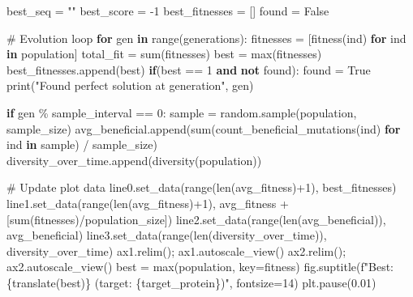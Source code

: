 \documentclass[
  letterpaper,
  DIV=11,
  numbers=noendperiod]{scrreprt}
\newenvironment{Shaded}{\begin{snugshade}}{\end{snugshade}}
\newcommand{\BuiltInTok}[1]{\textcolor[rgb]{0.00,0.23,0.31}{#1}}
\newcommand{\CommentTok}[1]{\textcolor[rgb]{0.37,0.37,0.37}{#1}}
\newcommand{\ControlFlowTok}[1]{\textcolor[rgb]{0.00,0.23,0.31}{\textbf{#1}}}
\newcommand{\DecValTok}[1]{\textcolor[rgb]{0.68,0.00,0.00}{#1}}
\newcommand{\FloatTok}[1]{\textcolor[rgb]{0.68,0.00,0.00}{#1}}
\newcommand{\KeywordTok}[1]{\textcolor[rgb]{0.00,0.23,0.31}{\textbf{#1}}}
\newcommand{\NormalTok}[1]{\textcolor[rgb]{0.00,0.23,0.31}{#1}}
\newcommand{\OperatorTok}[1]{\textcolor[rgb]{0.37,0.37,0.37}{#1}}
\newcommand{\SpecialCharTok}[1]{\textcolor[rgb]{0.37,0.37,0.37}{#1}}
\newcommand{\SpecialStringTok}[1]{\textcolor[rgb]{0.13,0.47,0.30}{#1}}
\newcommand{\StringTok}[1]{\textcolor[rgb]{0.13,0.47,0.30}{#1}}
\newcommand{\VariableTok}[1]{\textcolor[rgb]{0.07,0.07,0.07}{#1}}
\theoremstyle{definition}
\theoremstyle{remark}
\begin{document}
\begin{tcolorbox}
\begin{Shaded}
\begin{Highlighting}[]
\NormalTok{best\_seq }\OperatorTok{=} \StringTok{""}
\NormalTok{best\_score }\OperatorTok{=} \OperatorTok{{-}}\DecValTok{1}
\NormalTok{best\_fitnesses }\OperatorTok{=}\NormalTok{ []}
\NormalTok{found }\OperatorTok{=} \VariableTok{False}

\CommentTok{\# Evolution loop}
\ControlFlowTok{for}\NormalTok{ gen }\KeywordTok{in} \BuiltInTok{range}\NormalTok{(generations):}
\NormalTok{    fitnesses }\OperatorTok{=}\NormalTok{ [fitness(ind) }\ControlFlowTok{for}\NormalTok{ ind }\KeywordTok{in}\NormalTok{ population]}
\NormalTok{    total\_fit }\OperatorTok{=} \BuiltInTok{sum}\NormalTok{(fitnesses)}
\NormalTok{    best }\OperatorTok{=} \BuiltInTok{max}\NormalTok{(fitnesses)}
\NormalTok{    best\_fitnesses.append(best)}
    \ControlFlowTok{if}\NormalTok{(best }\OperatorTok{==} \DecValTok{1} \KeywordTok{and} \KeywordTok{not}\NormalTok{ found):}
\NormalTok{        found }\OperatorTok{=} \VariableTok{True}
        \BuiltInTok{print}\NormalTok{(}\StringTok{"Found perfect solution at generation"}\NormalTok{, gen)}
        
    \ControlFlowTok{if}\NormalTok{ gen }\OperatorTok{\%}\NormalTok{ sample\_interval }\OperatorTok{==} \DecValTok{0}\NormalTok{:}
\NormalTok{        sample }\OperatorTok{=}\NormalTok{ random.sample(population, sample\_size)}
\NormalTok{        avg\_beneficial.append(}\BuiltInTok{sum}\NormalTok{(count\_beneficial\_mutations(ind) }\ControlFlowTok{for}\NormalTok{ ind }\KeywordTok{in}\NormalTok{ sample) }\OperatorTok{/}\NormalTok{ sample\_size)}
\NormalTok{        diversity\_over\_time.append(diversity(population))}

        \CommentTok{\# Update plot data}
\NormalTok{        line0.set\_data(}\BuiltInTok{range}\NormalTok{(}\BuiltInTok{len}\NormalTok{(avg\_fitness)}\OperatorTok{+}\DecValTok{1}\NormalTok{), best\_fitnesses)}
\NormalTok{        line1.set\_data(}\BuiltInTok{range}\NormalTok{(}\BuiltInTok{len}\NormalTok{(avg\_fitness)}\OperatorTok{+}\DecValTok{1}\NormalTok{), avg\_fitness }\OperatorTok{+}\NormalTok{ [}\BuiltInTok{sum}\NormalTok{(fitnesses)}\OperatorTok{/}\NormalTok{population\_size])}
\NormalTok{        line2.set\_data(}\BuiltInTok{range}\NormalTok{(}\BuiltInTok{len}\NormalTok{(avg\_beneficial)), avg\_beneficial)}
\NormalTok{        line3.set\_data(}\BuiltInTok{range}\NormalTok{(}\BuiltInTok{len}\NormalTok{(diversity\_over\_time)), diversity\_over\_time)}
\NormalTok{        ax1.relim()}\OperatorTok{;}\NormalTok{ ax1.autoscale\_view()}
\NormalTok{        ax2.relim()}\OperatorTok{;}\NormalTok{ ax2.autoscale\_view()}
\NormalTok{        best }\OperatorTok{=} \BuiltInTok{max}\NormalTok{(population, key}\OperatorTok{=}\NormalTok{fitness)}
\NormalTok{        fig.suptitle(}\SpecialStringTok{f"Best: }\SpecialCharTok{\{}\NormalTok{translate(best)}\SpecialCharTok{\}}\SpecialStringTok{ (target: }\SpecialCharTok{\{}\NormalTok{target\_protein}\SpecialCharTok{\}}\SpecialStringTok{)"}\NormalTok{, fontsize}\OperatorTok{=}\DecValTok{14}\NormalTok{)}
\NormalTok{        plt.pause(}\FloatTok{0.01}\NormalTok{)}


\end{Highlighting}
\end{Shaded}
\end{tcolorbox}
\end{document}
